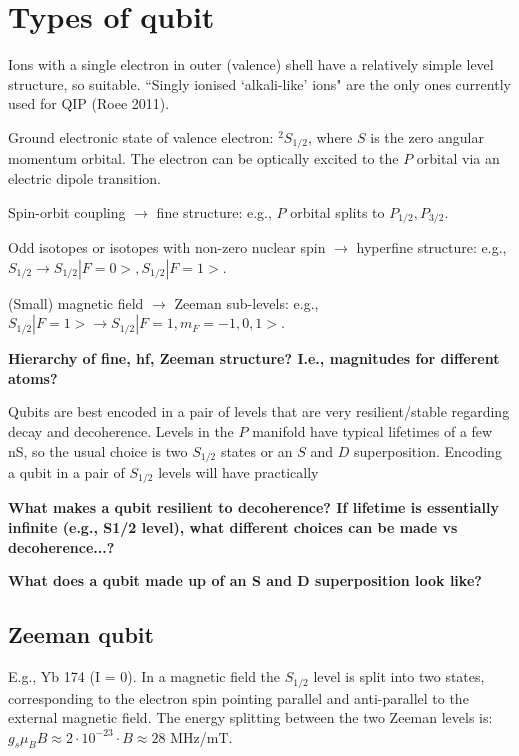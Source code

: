 \documentclass{article}
\begin{document}
\section{Types of qubit}

Ions with a single electron in outer (valence) shell have a relatively simple level structure, so suitable. ``Singly ionised `alkali-like' ions" are the only ones currently used for QIP (Roee 2011).

Ground electronic state of valence electron: $^2 S_{1/2}$, where $S$ is the zero angular momentum orbital. The electron can be optically excited to the $P$ orbital via an electric dipole transition. 

Spin-orbit coupling $\rightarrow$ fine structure: \newline e.g., $P$ orbital splits to $P_{1/2}, P_{3/2}$. 

Odd isotopes or isotopes with non-zero nuclear spin $\rightarrow$ hyperfine structure: \newline e.g., $S_{1/2} \rightarrow S_{1/2}|F=0>, S_{1/2}|F=1>$.

(Small) magnetic field $\rightarrow$ Zeeman sub-levels: \newline e.g., $S_{1/2}|F=1> \rightarrow S_{1/2}|F=1, m_F = -1, 0, 1>$.

\textbf{Hierarchy of fine, hf, Zeeman structure? I.e., magnitudes for different atoms?}

Qubits are best encoded in a pair of levels that are very resilient/stable regarding decay and decoherence. Levels in the $P$ manifold have typical lifetimes of a few nS, so the usual choice is two $S_{1/2}$ states or an $S$ and $D$ superposition. Encoding a qubit in a pair of $S_{1/2}$ levels will have practically

\textbf{What makes a qubit resilient to decoherence? If lifetime is essentially infinite (e.g., S1/2 level), what different choices can be made vs decoherence...?}

\textbf{What does a qubit made up of an S and D superposition look like?}


\subsection{Zeeman qubit}

E.g., Yb 174 (I = 0). In a magnetic field the $S_{1/2}$ level is split into two states, corresponding to the electron spin pointing parallel and anti-parallel to the external magnetic field. The energy splitting between the two Zeeman levels is: \newline $g_s \mu_B B \approx 2 \cdot 10^{-23} \cdot B\approx 28$ MHz/mT.
\end{document}
